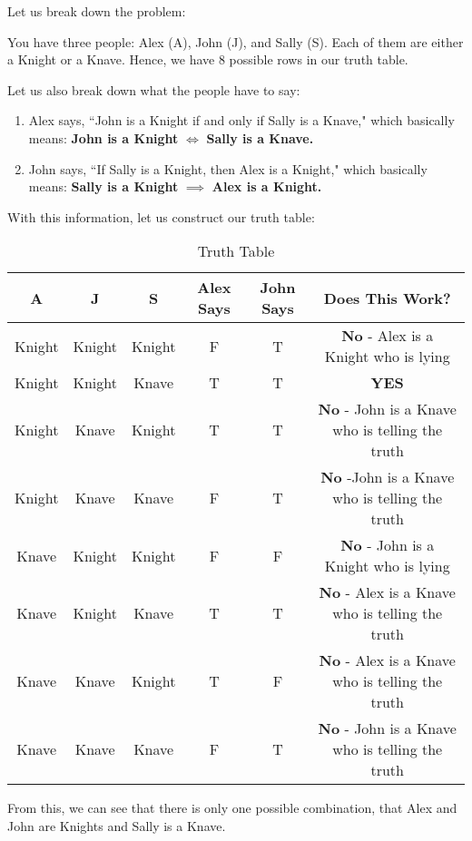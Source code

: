 \begin{solution}
    Let us break down the problem:

    You have three people: Alex (A), John (J), and Sally (S). Each of them are
    either a Knight or a Knave. Hence, we have 8 possible rows in our truth table.

    Let us also break down what the people have to say:

    \begin{enumerate}
        \item Alex says, ``John is a Knight if and only if Sally is a Knave,"
            which basically means: \textbf{John is a Knight} $\iff$
            \textbf{Sally is a Knave.}
        \item John says, ``If Sally is a Knight, then Alex is a Knight," which
            basically means: \textbf{Sally is a Knight} $\implies$ \textbf{Alex
            is a Knight.}
    \end{enumerate}

    With this information, let us construct our truth table:

    \begin{table}[ht]
        \caption{Truth Table}
        \centering
        \begin{tabular}{c c c c c c}
            \toprule
            A & J & S & Alex Says & John Says & Does This Work?\\ [0.5ex]
            \midrule
            Knight & Knight & Knight & F & T & \textbf{No} - Alex is a Knight who is
            lying\\
            Knight & Knight & Knave & T & T & \textbf{YES}\\
            Knight & Knave & Knight & T & T & \textbf{No} - John is a Knave who is telling
            the truth\\
            Knight & Knave & Knave & F & T & \textbf{No} -John is a Knave who is telling
            the truth\\
            Knave & Knight & Knight & F & F & \textbf{No} - John is a Knight who is lying\\
            Knave & Knight & Knave & T & T & \textbf{No} - Alex is a Knave who is telling
            the truth\\
            Knave & Knave & Knight & T & F & \textbf{No} - Alex is a Knave who is telling
            the truth \\
            Knave & Knave & Knave & F & T & \textbf{No} - John is a Knave who is telling
            the truth\\
            \bottomrule
        \end{tabular}
        \label{table:nonlin} %
    \end{table}
    \noindent From this, we can see that there is only one possible
    combination, that Alex and John are Knights and Sally is a Knave. \\ \\
\end{solution}

